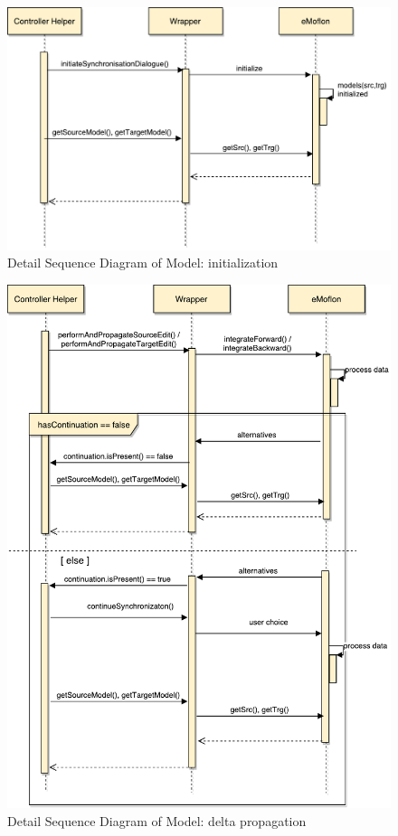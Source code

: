 \begin{figure}
	\includegraphics[width=1\textwidth]{figures/Sequence_Diagram-Model(init)}
	\caption{Detail Sequence Diagram of Model: initialization}
	\label{fig:Sequence_Diagram-Model(init)}
\end{figure}

\begin{figure}
	\includegraphics[width=1\textwidth]{figures/Sequence_Diagram-Model(delta)}
	\caption{Detail Sequence Diagram of Model: delta propagation}
	\label{fig:Sequence_Diagram-Model(delta)}
\end{figure}

